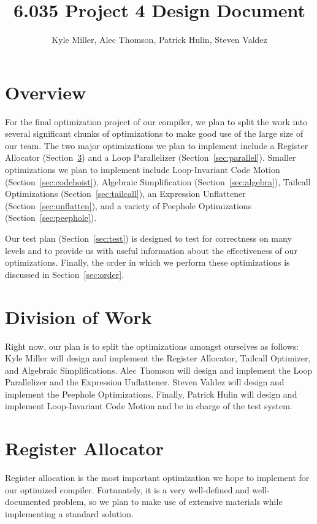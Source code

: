 \documentclass[11pt]{article}
\title{6.035 Project 4 Design Document}
\author{Kyle Miller, Alec Thomson, Patrick Hulin, Steven Valdez}
\begin{document}
\maketitle

\section {Overview} 

For the final optimization project of our compiler, we plan to split
the work into several significant chunks of optimizations to make good
use of the large size of our team. The two major optimizations we plan
to implement include a Register Allocator (Section~\ref{sec:register}) and a Loop
Parallelizer (Section~\ref{sec:parallel}). Smaller optimizations we plan to implement include
Loop-Invariant Code Motion (Section~\ref{sec:codehoist}), Algebraic
Simplification (Section~\ref{sec:algebra}), Tailcall Optimizations
(Section~\ref{sec:tailcall}), an Expression
Unflattener (Section~\ref{sec:unflatten}), and a variety of Peephole
Optimizations (Section~\ref{sec:peephole}). 

Our test plan (Section~\ref{sec:test}) is designed to test for correctness on many levels and
to provide us with useful information about the effectiveness of our
optimizations. Finally, the order in which we perform these
optimizations is discussed in Section~\ref{sec:order}.

\section {Division of Work}

Right now, our plan is to split the optimizations amongst ourselves as
follows: Kyle Miller will design and implement the Register
Allocator, Tailcall Optimizer, and Algebraic Simplifications. Alec Thomson will design and implement the Loop
Parallelizer and the Expression Unflattener. Steven Valdez will design and implement the Peephole
Optimizations. Finally, Patrick Hulin will design and implement
Loop-Invariant Code Motion and be in charge of the test system. 

\section {Register Allocator}
\label{sec:register}

Register allocation is the most important optimization we hope to
implement for our optimized compiler. Fortunately, it is a very
well-defined and well-documented problem, so we plan to make use of
extensive materials while implementing a standard solution. 
\end{document}
